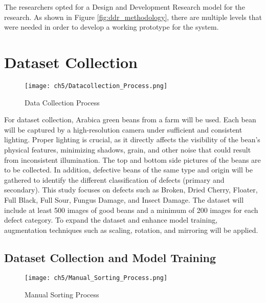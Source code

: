 The researchers opted for a Design and Development Research model for the research. As shown in Figure \ref{fig:ddr_methodology},  there are multiple levels that were needed in order to develop a working prototype for the system. 



\section{Dataset Collection}
\label{sec:dataset_collection}

\begin{figure}[H]
    \centering
    \texttt{[image: ch5/Datacollection\_Process.png]}
    \caption{Data Collection Process}
    \label{fig:data_collection_process}
\end{figure}
For dataset collection, Arabica green beans from a farm will be used. Each bean will be captured by a high-resolution camera under sufficient and consistent lighting. Proper lighting is crucial, as it directly affects the visibility of the bean’s physical features, minimizing shadows, grain, and other noise that could result from inconsistent illumination. The top and bottom side pictures of the beans are to be collected. In addition, defective beans of the same type and origin will be gathered to identify the different classification of defects (primary and secondary). This study focuses on defects such as Broken, Dried Cherry, Floater, Full Black, Full Sour, Fungus Damage, and Insect Damage. The dataset will include at least 500 images of good beans and a minimum of 200 images for each defect category. To expand the dataset and enhance model training, augmentation techniques such as scaling, rotation, and mirroring will be applied. 

\subsection{Dataset Collection and Model Training}

\begin{figure}[H]
    \centering
    \texttt{[image: ch5/Manual\_Sorting\_Process.png]}
    \caption{Manual Sorting Process}
    \label{fig:manual_sorting}
\end{figure}

